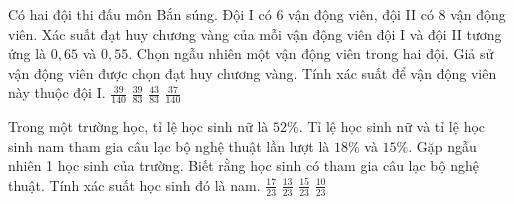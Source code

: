 \begin{ex}%
    Có hai đội thi đấu môn Bắn súng. Đội I có 6 vận động viên, đội II có 8 vận động viên. Xác suất đạt huy chương vàng của mỗi vận động viên đội I và đội II tương ứng là $0,65$ và $0,55$. Chọn ngẫu nhiên một vận động viên trong hai đội. Giả sử vận động viên được chọn đạt huy chương vàng. Tính xác suất để vận động viên này thuộc đội I.
    \choice
    {$\frac{39}{140}$}
    {\True $\frac{39}{83}$}
    {$\frac{43}{83}$}
    {$\frac{37}{140}$}
\end{ex}
\begin{ex}%
    Trong một trường học, tỉ lệ học sinh nữ là $52\%$. Tỉ lệ học sinh nữ và tỉ lệ học sinh nam tham gia câu lạc bộ nghệ thuật lần lượt là $18\%$ và $15\%$. Gặp ngẫu nhiên 1 học sinh của trường. Biết rằng học sinh có tham gia câu lạc bộ nghệ thuật. Tính xác suất học sinh đó là nam.
    \choice
    {$\frac{17}{23}$}
    {$\frac{13}{23}$}
    {$\frac{15}{23}$}
    {\True $\frac{10}{23}$}
\end{ex}

